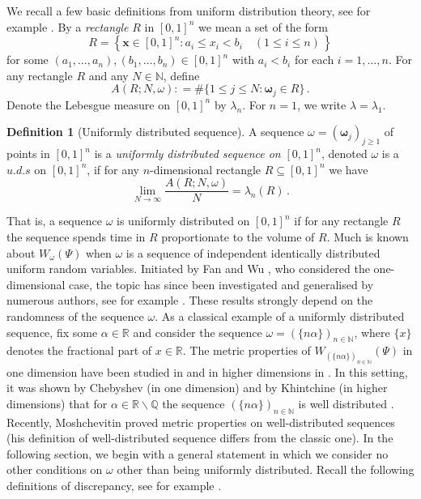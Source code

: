 \documentclass{amsart}
\theoremstyle{definition}
\newtheorem{definition}[theorem]{Definition}
\newcommand{\N}{\mathbb N}%
\newcommand{\Q}{\mathbb Q}
\newcommand{\R}{\mathbb R}
\newcommand{\0}{\mbf 0}%
\def\N{\mathbb N}
\def\Q{\mathbb Q}
\def\R{\mathbb R}
\begin{document}
We recall a few basic definitions from uniform distribution theory, see for example \cite{KuipersNiederreiter1974}. By a \textit{rectangle} $R$ in $[0,1]^n$ we mean a set of the form
\begin{equation*}
    R=\left\{ \mathbf{x} \in [0,1]^{n}: a_{i}\leq x_{i}<b_{i} \quad (1\leq i \leq n) \, \right\}
\end{equation*}
for some $(a_{1},\dots, a_{n}), (b_{1},\dots, b_{n}) \in [0,1]^{n}$ with $a_{i}<b_{i}$ for each $i=1, \ldots, n$. For any rectangle $R$ and any $N\in\N$, define
\begin{equation*}
    A(R;N,\omega): =\#\{1\leq j\leq N : \boldsymbol{\omega}_{j}\in R\} \,.
\end{equation*}
Denote the Lebesgue measure on $[0,1]^n$ by $\lambda_n$. For $n=1$, we write $\lambda = \lambda_1$.
\begin{definition}[Uniformly distributed sequence]
A sequence $\omega= (\boldsymbol{\omega}_{j})_{j \geq 1 }$ of points in $[0,1]^n$ is a \textit{uniformly distributed sequence on} $[0,1]^{n}$, denoted $\omega$ is a $u.d.s$ on $[0,1]^{n}$, if for any $n$-dimensional rectangle $R\subseteq [0,1]^{n}$ we have
\begin{equation*}
    \lim_{N\to \infty} \frac{ A(R;N,\omega)}{N} = \lambda_n(R)\, .
\end{equation*}
\end{definition}
That is, a sequence $\omega$ is uniformly distributed on $[0,1]^{n}$ if for any rectangle $R$ the sequence spends time in $R$ proportionate to the volume of $R$. 
Much is known about $W_{\omega}(\Psi)$ when $\omega$ is a sequence of independent identically distributed uniform random variables. Initiated by Fan and Wu \cite{FanWu04}, who considered the one-dimensional case, the topic has since been investigated and generalised by numerous authors, see for example \cite{ EkstPers18, FJJS18}. These results strongly depend on the randomness of the sequence $\omega$. 
As a classical example of a uniformly distributed sequence, fix some $\alpha\in \R$ and consider the sequence $\omega=(\{n\alpha\})_{n\in \N}$, where $\{x\}$ denotes the fractional part of $x\in\R$. 
The metric properties of $W_{(\{n\alpha\})_{n\in \N}}(\Psi)$ in one dimension have been studied in \cite{Bugeaud03,   KimRamWang18, Tseng08} and in higher dimensions in \cite{BDGW23b,TKim23, HussWard23, Shapira13}. In this setting, it was shown by Chebyshev (in one dimension) and by Khintchine (in higher dimensions) that for $\alpha\in\R\backslash\Q$ the sequence $(\{n\alpha\})_{n\in \N}$ is well distributed \cite{Khin1948}. Recently, Moshchevitin proved metric properties on well-distributed sequences \cite{Mosh23} (his definition of well-distributed sequence differs from the classic one). In the following section, we begin with a general statement in which we consider no other conditions on $\omega$ other than being uniformly distributed. Recall the following definitions of discrepancy, see for example \cite[Chapter 2]{KuipersNiederreiter1974}. 
\end{document}

